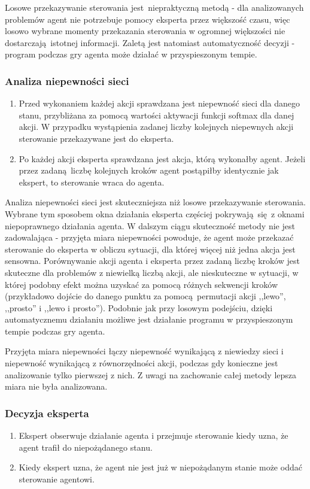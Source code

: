 \documentclass[polish,master,a4paper,oneside]{ppfcmthesis}
\begin{document}
Losowe przekazywanie sterowania jest niepraktyczną metodą - dla analizowanych problemów agent nie potrzebuje pomocy eksperta przez większość czasu, więc losowo wybrane momenty przekazania sterowania w ogromnej większości nie dostarczają istotnej informacji. Zaletą jest natomiast automatyczność decyzji - program podczas gry agenta może działać w przyspieszonym tempie.

\subsubsection{Analiza niepewności sieci}
\begin{enumerate}
\item Przed wykonaniem każdej akcji sprawdzana jest niepewność sieci dla danego stanu, przybliżana za pomocą wartości aktywacji funkcji softmax dla danej akcji. W przypadku wystąpienia zadanej liczby kolejnych niepewnych akcji sterowanie przekazywane jest do eksperta.
\item Po każdej akcji eksperta sprawdzana jest akcja, którą wykonałby agent. Jeżeli przez zadaną liczbę kolejnych kroków agent postąpiłby identycznie jak ekspert, to sterowanie wraca do agenta.
\end{enumerate}

Analiza niepewności sieci jest skuteczniejsza niż losowe przekazywanie sterowania. Wybrane tym sposobem okna działania eksperta częściej pokrywają się z oknami niepoprawnego działania agenta. W dalszym ciągu skuteczność metody nie jest zadowalająca - przyjęta miara niepewności powoduje, że agent może przekazać sterowanie do eksperta w obliczu sytuacji, dla której więcej niż jedna akcja jest sensowna. Porównywanie akcji agenta i eksperta przez zadaną liczbę kroków jest skuteczne dla problemów z niewielką liczbą akcji, ale nieskuteczne w sytuacji, w której podobny efekt można uzyskać za pomocą różnych sekwencji kroków (przykładowo dojście do danego punktu za pomocą permutacji akcji ,,lewo'', ,,prosto'' i ,,lewo i prosto''). Podobnie jak przy losowym podejściu, dzięki automatycznemu działaniu możliwe jest działanie programu w przyspieszonym tempie podczas gry agenta.

Przyjęta miara niepewności łączy niepewność wynikającą z niewiedzy sieci i niepewność wynikającą z równorzędności akcji, podczas gdy konieczne jest analizowanie tylko pierwszej z nich. Z uwagi na zachowanie całej metody lepsza miara nie była analizowana.

\subsubsection{Decyzja eksperta}\label{expert_call}
\begin{enumerate}
\item Ekspert obserwuje działanie agenta i przejmuje sterowanie kiedy uzna, że agent trafił do niepożądanego stanu.
\item Kiedy ekspert uzna, że agent nie jest już w niepożądanym stanie może oddać sterowanie agentowi.
\end{enumerate}
\end{document}

